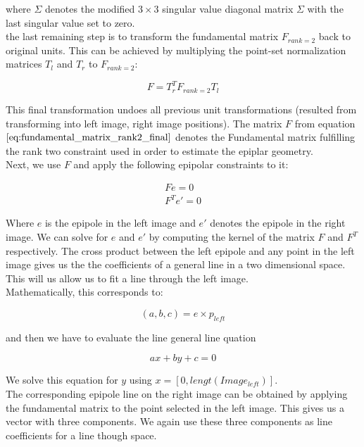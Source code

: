 \documentclass{paper}
\begin{document}
where $\Sigma$ denotes the modified $3 \times 3$ singular value diagonal matrix $\Sigma$ with the last singular value set to zero. \\

the last remaining step is to transform the fundamental matrix $F_{rank=2}$ back to original units. This can be achieved by multiplying the point-set normalization matrices $T_l$ and $T_r$ to $F_{rank=2}$:

\begin{equation}
    F = T_{r}^{T} F_{rank=2} T_{l} 
\label{eq:fundamental_matrix_rank2_final}
\end{equation}

This final transformation undoes all previous unit transformations (resulted from transforming into left image, right image positions). The matrix $F$ from equation $\ref{eq:fundamental_matrix_rank2_final}$ denotes the Fundamental matrix fulfilling the rank two constraint used in order to estimate the epiplar geometry. \\

Next, we use $F$ and apply the following epipolar constraints to it:

\begin{align*}
F e = 0 \\
F^{T} e' = 0 
\end{align*}

Where $e$ is the epipole in the left image and $e'$ denotes the epipole in the right image. We can solve for $e$ and $e'$ by computing the kernel of the matrix $F$ and $F^{T}$ respectively. The cross product between the left epipole and any point in the left image gives us the the coefficients of a general line in a two dimensional space. This will us allow us to fit a line through the left image. \\

Mathematically, this corresponds to:

\begin{equation}
    (a,b,c) = e \times p_{left}
\end{equation}

and then we have to evaluate the line general line quation 

\begin{equation}
    ax + by + c = 0
\end{equation}

We solve this equation for $y$ using $x = [0,lengt(Image_{left})]$. \\

The corresponding epipole line on the right image can be obtained by applying the fundamental matrix to the point selected in the left image. This gives us a vector with three components. We again use these three components as line coefficients for a line though space. \\
\end{document}
